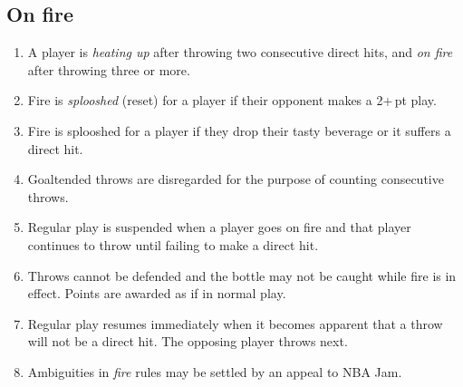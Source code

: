 \documentclass[11pt,letterpaper,twocolumn,english,DIV=calc]{scrartcl}
\begin{document}
\newpage
\subsection{On fire}
\begin{enumerate}[leftmargin=2.8em, label=\thesubsection.\arabic*]
	\item \label{enu:fire_count} A player is \emph{heating up} after throwing two consecutive direct hits, and \emph{on fire} after throwing three or more.
	\item \label{enu:splooshing} Fire is \emph{splooshed} (reset) for a player if their opponent makes a 2+\,pt play.
	\item Fire is splooshed for a player if they drop their tasty beverage or it suffers a direct hit.
	\item Goaltended throws are disregarded for the purpose of counting consecutive throws.
	\item Regular play is suspended when a player goes on fire and that player continues to throw until failing to make a direct hit.
	\item Throws cannot be defended and the bottle may not be caught while fire is in effect. 
	Points are awarded as if in normal play.
	\item Regular play resumes immediately when it becomes apparent that a throw will not be a direct hit. The opposing player throws next.
	\item Ambiguities in \emph{fire} rules may be settled by an appeal to NBA Jam.
\end{enumerate}
\end{document}
